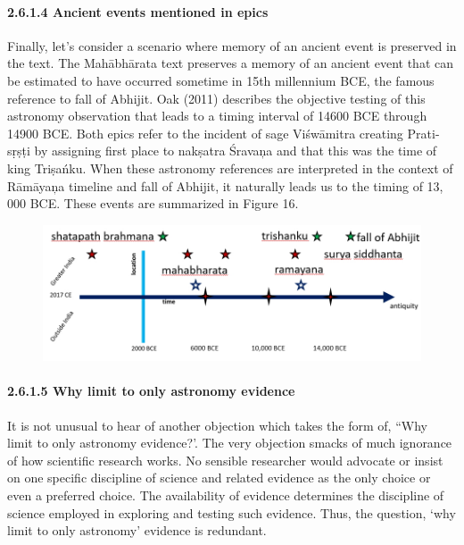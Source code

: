 \paragraph*{2.6.1.4 Ancient events mentioned in epics}

Finally, let’s consider a scenario where memory of an ancient event is preserved in the text. The Mahābhārata text preserves a memory of an ancient event that can be estimated to have occurred sometime in 15th millennium BCE, the famous reference to fall of Abhijit. Oak (2011) describes the objective testing of this astronomy observation that leads to a timing interval of 14600 BCE through 14900 BCE. Both epics refer to the incident of sage Viśwāmitra creating Prati-sṛṣṭi by assigning first place to nakṣatra Śravaņa and that this was the time of king Triṣańku. When these astronomy references are interpreted in the context of Rāmāyaņa timeline and fall of Abhijit, it naturally leads us to the timing of 13, 000 BCE. These events are summarized in Figure 16.

\begin{figure}[!htbp]
\includegraphics[scale=0.3]{"images/8-16.jpg"}
\caption{}\label{art8-fig16}
\end{figure}


\paragraph*{2.6.1.5 Why limit to only astronomy evidence}

It is not unusual to hear of another objection which takes the form of, “Why limit to only astronomy evidence?’. The very objection smacks of much ignorance of how scientific research works. No sensible researcher would advocate or insist on one specific discipline of science and related evidence as the only choice or even a preferred choice. The availability of evidence determines the discipline of science employed in exploring and testing such evidence. Thus, the question, ‘why limit to only astronomy’ evidence is redundant.

